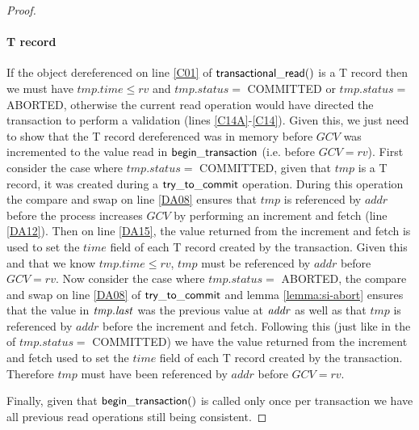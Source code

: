 \begin{proof}
\paragraph{T record} If the object dereferenced on line \ref{C01} of $\sf{transactional\_read}()$ is a T record then we must have $\mathit{tmp.time} \leq \mathit{rv}$ and 
$\mathit{tmp.status} = $ COMMITTED or $\mathit{tmp.status} = $ ABORTED, otherwise the current read operation would have directed the transaction
to perform a validation (lines \ref{C14A}-\ref{C14}).
Given this, we just need to show that the T record dereferenced was in memory before $\mathit{GCV}$ was incremented to the value
read in $\sf{begin\_transaction}$ (i.e. before $\mathit{GCV} = \mathit{rv}$).
First consider the case where $\mathit{tmp.status} = $ COMMITTED, given that $\mathit{tmp}$ is a T record, it was created
during a $\sf{try\_to\_commit}$ operation.
During this operation  the compare and swap on line \ref{DA08} ensures  that $\mathit{tmp}$ is referenced by $\mathit{addr}$ before the process
increases $\mathit{GCV}$ by performing an increment and fetch (line \ref{DA12}).
Then on line \ref{DA15}, the value returned from the increment and fetch is used to set the $\mathit{time}$ field of each T record
created by the transaction.
Given this and that we know $\mathit{tmp.time} \leq \mathit{rv}$, $\mathit{tmp}$ must be referenced by $\mathit{addr}$ before
$\mathit{GCV} = \mathit{rv}$.
Now consider the case where $\mathit{tmp.status} = $ ABORTED, the compare and swap on line \ref{DA08} of $\sf{try\_to\_commit}$ and lemma \ref{lemma:si-abort} ensures
that the value in $\ms{tmp.last}$ was the previous value at $\ms{addr}$ as well as that $\mathit{tmp}$ is referenced by $\mathit{addr}$
before the increment and fetch.
Following this (just like in the of $\mathit{tmp.status} = $ COMMITTED) we have the value returned from the increment and fetch
used to set the $\mathit{time}$ field of each T record created by the transaction.
Therefore $\mathit{tmp}$ must have been referenced by $\mathit{addr}$ before $\mathit{GCV} = \mathit{rv}$.

Finally, given that $\sf{begin\_transaction}()$ is called only once per transaction
we have all previous read operations still being consistent.
\end{proof}




